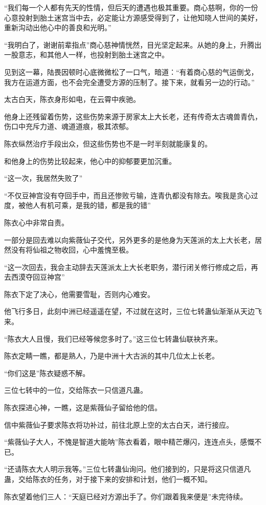 \begin{this_body}
“我们每一个人都有先天的性情，但后天的遭遇也极其重要。商心慈啊，你的一份心意投射到胎土迷宫当中去，必定能让方源感受得到了，让他知晓人世间的美好，重新沟动出他心中的善良和光明。”

“我明白了，谢谢前辈指点”商心慈神情恍然，目光坚定起来。从她的身上，升腾出一股意志，和其他人一样，也投射到胎土迷宫之中。

见到这一幕，陆畏因顿时心底微微松了一口气，暗道：“有着商心慈的气运倒戈，我方在运道方面，也不会完全遭受方源的压制了。接下来，就看另一边的行动。”

太古白天，陈衣身形如电，在云霄中疾驰。

他身上还残留着伤势，这些伤势来源于房家太上大长老，还有传奇太古魂兽青仇，伤口中充斥力道、魂道道痕，极其浓郁。

陈衣纵然治疗手段出众，但这些伤势也不是一时半刻就能康复的。

和他身上的伤势比较起来，他心中的抑郁要更加沉重。

“这一次，我居然失败了”

“不仅豆神宫没有夺回手中，而且还惨败亏输，连青仇都没有除去。唉我是贪心过度，被他人有机可乘，是我的错，都是我的错”

陈衣心中非常自责。

一部分是回去难以向紫薇仙子交代，另外更多的是他身为天莲派的太上大长老，居然没有将仙祖之物收回，心中羞愧至极。

“这一次回去，我会主动辞去天莲派太上大长老职务，潜行闭关修行修成之后，再去西漠夺回豆神宫”

陈衣下定了决心，他需要雪耻，否则内心难安。

他飞行多日，此刻中洲已经遥遥在望，不过就在这时，三位七转蛊仙渐渐从天边飞来。

“陈衣大人且慢，我们已经等候您多时了。”这三位七转蛊仙联袂齐来。

陈衣定睛一瞧，都是熟人，乃是中洲十大古派的其中几位太上长老。

“你们这是”陈衣疑惑不解。

三位七转中的一位，交给陈衣一只信道凡蛊。

陈衣探进心神，一瞧，这是紫薇仙子留给他的信。

信中紫薇仙子要求陈衣将功补过，前往北原上空的太古白天，进行接应。

“紫薇仙子大人，不愧是智道大能呐”陈衣看着，眼中精芒爆闪，连连点头，感慨不已。

“还请陈衣大人明示我等。”三位七转蛊仙询问。他们接到的，只是将这只信道凡蛊，交给陈衣的任务，对于接下来的安排和计划，他们一概不知。

陈衣望着他们三人：“天庭已经对方源出手了。你们跟着我来便是”未完待续。

\end{this_body}

